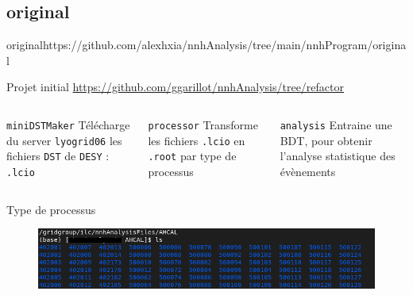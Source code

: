 \documentclass[9pt]{beamer}
\begin{document}
\subsection{original}

\begin{frame}{original}{https://github.com/alexhxia/nnhAnalysis/tree/main/nnhProgram/original}

\begin{block}{Projet initial}
	\url{https://github.com/ggarillot/nnhAnalysis/tree/refactor}
\end{block}

\begin{columns}

	\begin{column}{0.33\textwidth}
		\begin{block}{\texttt{miniDSTMaker}}
			Télécharge du server \texttt{lyogrid06} les fichiers \texttt{DST} de \texttt{DESY} : \texttt{.lcio}
		\end{block}
	\end{column}
	
	\begin{column}{0.33\textwidth}
		\begin{block}{\texttt{processor}}
			Transforme les fichiers \texttt{.lcio} en \texttt{.root} par type de processus
		\end{block}
	\end{column}
	
	\begin{column}{0.33\textwidth}
		\begin{block}{\texttt{analysis}}
			Entraine une BDT, pour obtenir l'analyse statistique des évènements
		\end{block}
	\end{column}

\end{columns}

\begin{block}{Type de processus}
	\begin{figure}
		\center
		\includegraphics[width=\textwidth]{../img/listeProcessus.png} 
	\end{figure}
\end{block}

\end{frame}
\end{document}

